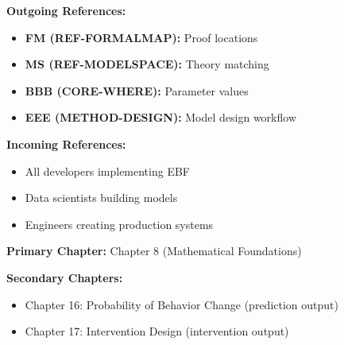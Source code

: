 \begin{tcolorbox}[colback=gray!5!white, colframe=gray!75!black,
    title=\textbf{Cross-Reference Map}]

\textbf{Outgoing References:}
\begin{itemize}[nosep]
    \item \textbf{FM (REF-FORMALMAP):} Proof locations
    \item \textbf{MS (REF-MODELSPACE):} Theory matching
    \item \textbf{BBB (CORE-WHERE):} Parameter values
    \item \textbf{EEE (METHOD-DESIGN):} Model design workflow
\end{itemize}

\textbf{Incoming References:}
\begin{itemize}[nosep]
    \item All developers implementing EBF
    \item Data scientists building models
    \item Engineers creating production systems
\end{itemize}

\end{tcolorbox}

\begin{tcolorbox}[colback=purple!5!white, colframe=purple!75!black,
    title=\textbf{Chapter Linkage}]

\textbf{Primary Chapter:} Chapter 8 (Mathematical Foundations)

\textbf{Secondary Chapters:}
\begin{itemize}[nosep]
    \item Chapter 16: Probability of Behavior Change (prediction output)
    \item Chapter 17: Intervention Design (intervention output)
\end{itemize}

\end{tcolorbox}

